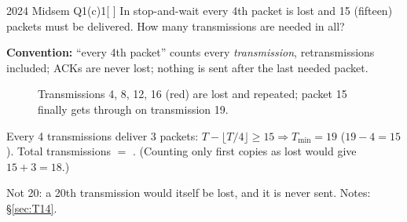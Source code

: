 \begin{question}{2024 Midsem Q1(c)}{1}[ ]
In stop-and-wait every 4th packet is lost and 15 (fifteen) packets must be delivered. How many transmissions are needed in all?
\end{question}
\label{q:MS2024-1c}
\begin{solution}
\textbf{Convention:} ``every 4th packet'' counts every \emph{transmission}, retransmissions included; ACKs are never lost; nothing is sent after the last needed packet. 
\begin{figure}[H]\centering
{}
\caption{Transmissions 4, 8, 12, 16 (red) are lost and repeated; packet 15 finally gets through on transmission 19.}
\end{figure}
Every 4 transmissions deliver 3 packets: $T-\lfloor T/4\rfloor \ge 15 \Rightarrow T_{\min}=19$ ($19-4=15$). Total transmissions $=$ .
(Counting only first copies as lost would give $15+3=18$.)
\end{solution}
\begin{warningbox}Not 20: a 20th transmission would itself be lost, and it is never sent. Notes: \S\ref{sec:T14}.\end{warningbox}

